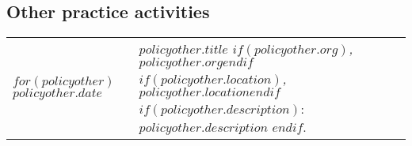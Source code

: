 \documentclass[martgin, line]{article}
\begin{document}
\subsection*{Other practice activities}

\setlength{\extrarowheight}{.75em}
\begin{longtable}[l]{lp{5in}}   
$for(policyother)$
$policyother.date$&
\parbox[t]{5in}{
    \textit{$policyother.title$%
    $if(policyother.org)$, $policyother.org$$endif$%
    $if(policyother.location)$, $policyother.location$$endif$}%
    $if(policyother.description)$: %
    $policyother.description$%
    $endif$.%
  }\\
$endfor$
\end{longtable}
\setlength{\extrarowheight}{0em}

\end{document}
